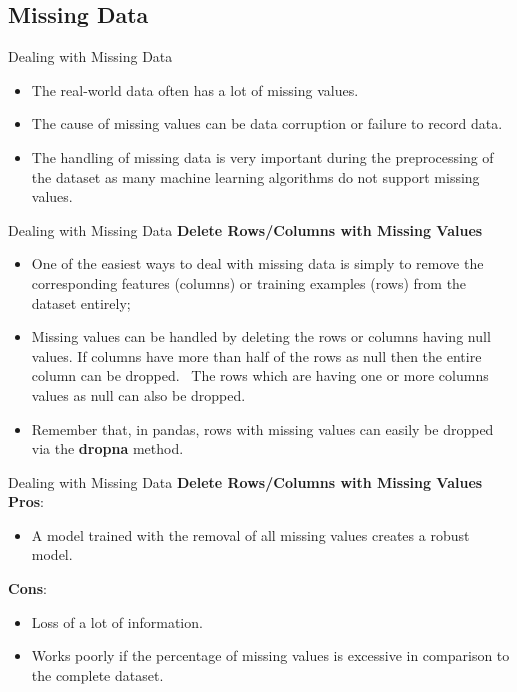 \documentclass[11pt]{beamer}
\begin{document}
\subsection{Missing Data \\ \scalebox{0.8}{}}
%
%
\begin{frame}{Dealing with Missing Data}
	\begin{itemize}
		\item The real-world data often has a lot of missing values. 
		\item The cause of missing values can be data corruption or failure to record data. 
		\item The handling of missing data is very important during the preprocessing of the dataset as many machine learning algorithms do not support missing values.
	\end{itemize}
\end{frame}
%
%
\begin{frame}{Dealing with Missing Data}
\textbf{Delete Rows/Columns with Missing Values} 
\begin{itemize}
\item One of the easiest ways to deal with missing data is simply to remove the
corresponding features (columns) or training examples (rows) from the dataset
entirely; 
\item Missing values can be handled by deleting the rows or columns having null values. If columns have more than half of the rows as null then the entire column can be dropped.
\ The rows which are having one or more columns values as null can also be dropped.
\item  Remember that, in pandas, rows with missing values can easily be dropped via the \textbf{dropna} method.
\end{itemize}
\end{frame}
%
%
\begin{frame}{Dealing with Missing Data}
\textbf{Delete Rows/Columns with Missing Values} \\
\vspace{0.5cm}
\textbf{Pros}:
\begin{itemize}
\item A model trained with the removal of all missing values creates a robust model.
\end{itemize}
\textbf{Cons}:
\begin{itemize}
\item Loss of a lot of information.
\item Works poorly if the percentage of missing values is excessive in comparison to the complete dataset.
\end{itemize}
\end{frame}
\end{document}
